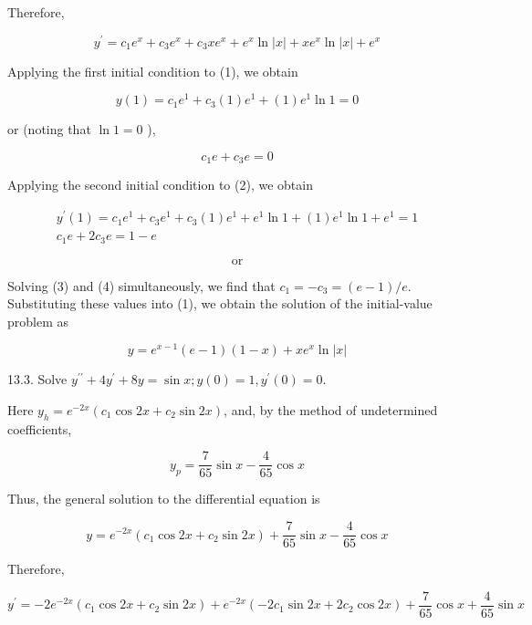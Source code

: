 \documentclass[10pt]{article}
\begin{document}
Therefore,


\begin{equation*}
y^{\prime}=c_{1} e^{x}+c_{3} e^{x}+c_{3} x e^{x}+e^{x} \ln |x|+x e^{x} \ln |x|+e^{x} \tag{2}
\end{equation*}


Applying the first initial condition to (1), we obtain

$$
y(1)=c_{1} e^{1}+c_{3}(1) e^{1}+(1) e^{1} \ln 1=0
$$

or (noting that $\ln 1=0$ ),


\begin{equation*}
c_{1} e+c_{3} e=0 \tag{3}
\end{equation*}


Applying the second initial condition to (2), we obtain


\begin{gather*}
y^{\prime}(1)=c_{1} e^{1}+c_{3} e^{1}+c_{3}(1) e^{1}+e^{1} \ln 1+(1) e^{1} \ln 1+e^{1}=1 \\
c_{1} e+2 c_{3} e=1-e \tag{4}
\end{gather*}


$$
\text { or }
$$

Solving (3) and (4) simultaneously, we find that $c_{1}=-c_{3}=(e-1) / e$. Substituting these values into (1), we obtain the solution of the initial-value problem as

$$
y=e^{x-1}(e-1)(1-x)+x e^{x} \ln |x|
$$

13.3. Solve $y^{\prime \prime}+4 y^{\prime}+8 y=\sin x ; y(0)=1, y^{\prime}(0)=0$.

Here $y_{h}=e^{-2 x}\left(c_{1} \cos 2 x+c_{2} \sin 2 x\right)$, and, by the method of undetermined coefficients,

$$
y_{p}=\frac{7}{65} \sin x-\frac{4}{65} \cos x
$$

Thus, the general solution to the differential equation is


\begin{equation*}
y=e^{-2 x}\left(c_{1} \cos 2 x+c_{2} \sin 2 x\right)+\frac{7}{65} \sin x-\frac{4}{65} \cos x \tag{1}
\end{equation*}


Therefore,


\begin{equation*}
y^{\prime}=-2 e^{-2 x}\left(c_{1} \cos 2 x+c_{2} \sin 2 x\right)+e^{-2 x}\left(-2 c_{1} \sin 2 x+2 c_{2} \cos 2 x\right)+\frac{7}{65} \cos x+\frac{4}{65} \sin x \tag{2}
\end{equation*}
\end{document}
